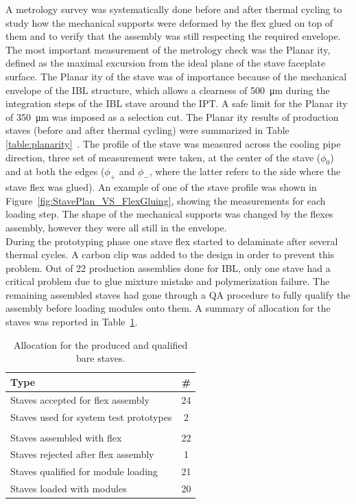 A metrology survey was systematically done before and after thermal cycling to study how the mechanical supports were deformed by the flex glued on top of them and to verify that the assembly was still respecting the required envelope. The most important measurement of the metrology check was the Planar ity, defined as the maximal excursion from the ideal plane of the stave faceplate surface. The Planar ity of the stave was of importance because of the mechanical envelope of the IBL structure, which allows a clearness of \SI{500}{\micro\meter} during the integration steps of the IBL stave around the IPT. A safe limit for the Planar ity of \SI{350}{\micro\meter} was imposed as a selection cut. The Planar ity results of production staves (before and after thermal cycling) were summarized in Table \ref{table:planarity}~\cite{LoadingNote}. 
The profile of the stave was measured across the cooling pipe direction, three set of measurement were taken, at the center of the stave ($\phi_0$) and at both the edges ($\phi_+$ and $\phi_-$, where the latter refers to the side where the stave flex was glued). An example of one of the stave profile was shown in Figure~\ref{fig:StavePlan_VS_FlexGluing}, showing the measurements for each loading step. The shape of the mechanical supports was changed by the flexes assembly, however they were all still in the envelope.\\
During the prototyping phase one stave flex started to delaminate after several thermal cycles. A carbon clip was added to the design in order to prevent this problem. Out of 22 production assemblies done for IBL, only one stave had a critical problem due to glue mixture mistake and polymerization failure. The remaining assembled staves had gone through a QA procedure to fully qualify the assembly before loading modules onto them. A summary of allocation for the staves was reported in Table~\ref{tab:BareStavesAllocation}.


\begin{table}
\centering
\begin{tabular}{l c  }
\hline \hline
        Type & \#      \\
\hline
Staves accepted for flex assembly & 24 \\
Staves used for system test prototypes & 2 \\
  & \\
Staves assembled with flex  & 22 \\
Staves rejected after flex assembly  & 1 \\
Staves qualified for module loading& 21 \\
Staves loaded with modules  & 20 \\
\hline
\end{tabular}   
\caption{Allocation for the produced and qualified bare staves.
\label{tab:BareStavesAllocation}}
\end{table}



